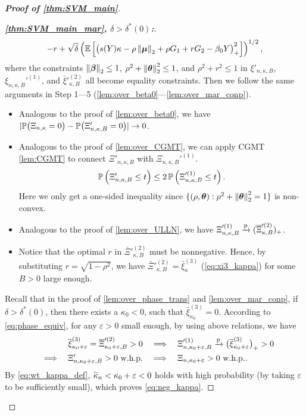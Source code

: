 \begin{proof}[\textbf{Proof of \cref{thm:SVM_main}}]
\begin{proof}[\textbf{\emph{\ref{thm:SVM_main_mar}, $\delta > \delta^*(0)$:}}]
\begin{align*}
    -r + \sqrt{\delta} \left( \E\left[ \bigl(  s(Y) \kappa - \rho \norm{\bmu}_2 + \rho G_1 + rG_2 - \beta_0 Y \bigr)_+^2 \right] \right)^{1/2},
\end{align*}
where the constraints $\norm{\vbeta}_2 \le 1$, $\rho^2 + \norm{\vtheta}_2^2 \le 1$, and $\rho^2 + r^2 \le 1$ in $\xi'_{n, \kappa, B}$, $\xi_{n, \kappa, B}'^{(1)}$, and $\bar\xi'^{(2)}_{\kappa, B}$ all become equality constraints. Then we follow the same arguments in Step 1---5 (\cref{lem:over_beta0}---\ref{lem:over_mar_conp}).
\begin{itemize}
    \item Analogous to the proof of \cref{lem:over_beta0}, we have $| \P\bigl( \Xi_{n, \kappa} = 0 \bigr) - \P\bigl(\Xi'_{n, \kappa, B} = 0 \bigr) | \to 0$.
    \item Analogous to the proof of \cref{lem:over_CGMT}, we can apply CGMT \cref{lem:CGMT} to connect $\Xi'_{n, \kappa, B}$ with $\Xi_{n, \kappa, B}'^{(1)}$. 
\begin{equation*}
    \P\left( \Xi'_{n, \kappa, B} \le t \vphantom{\Xi'^{(1)}_{n, \kappa, B}} \right) 
    \le 2\, \P\left( \Xi'^{(1)}_{n, \kappa, B} \le t \right).
\end{equation*}
    Here we only get a one-sided inequality since $\{(\rho, \vtheta): \rho^2 + \norm{\vtheta}_2^2 = 1 \}$ is non-convex.
    \item Analogous to the proof of \cref{lem:over_ULLN}, we have $\Xi'^{(1)}_{n, \kappa, B}  \conp ( \bar\Xi'^{(2)}_{\kappa, B} )_+$.
    \item Notice that the optimal $r$ in $\bar\Xi'^{(2)}_{\kappa, B}$ must be nonnegative. Hence, by substituting $r = \sqrt{1 - \rho^2}$, we have $\bar\Xi'^{(2)}_{\kappa, B} = \bar\xi_{\kappa}^{(3)}$ (\cref{eq:xi3_kappa}) for some $B > 0$ large enough.
\end{itemize}
Recall that in the proof of \cref{lem:over_phase_trans} and \ref{lem:over_mar_conp}, if $\delta > \delta^*(0)$, then there exists a $\kappa_0 < 0$, such that $\bar\xi_{\kappa_0}^{(3)} = 0$. According to \cref{eq:phase_equiv}, for any $\varepsilon > 0$ small enough, by using above relations, we have 
\begin{align*}
\bar\xi_{\kappa_0 + \varepsilon}^{(3)} = \bar\Xi'^{(2)}_{\kappa_0 + \varepsilon, B} > 0
\quad & \Longrightarrow \quad
\Xi'^{(1)}_{n, \kappa_0 + \varepsilon, B}  \conp \bigl( \bar\xi^{(3)}_{\kappa_0 + \varepsilon} \bigr)_+ > 0
\\
\quad \Longrightarrow \quad
\Xi'_{n, \kappa_0 + \varepsilon, B} > 0 ~ \text{w.h.p.}
\quad & \Longrightarrow \quad
\Xi_{n, \kappa_0 + \varepsilon} > 0 ~ \text{w.h.p.}.
\end{align*}
By \cref{eq:wt_kappa_def}, $\wt\kappa_n < \kappa_0 + \varepsilon < 0$ holds with high probability (by taking $\varepsilon$ to be sufficiently small), which proves \cref{eq:neg_kappa}.


\end{proof}
\end{proof}
